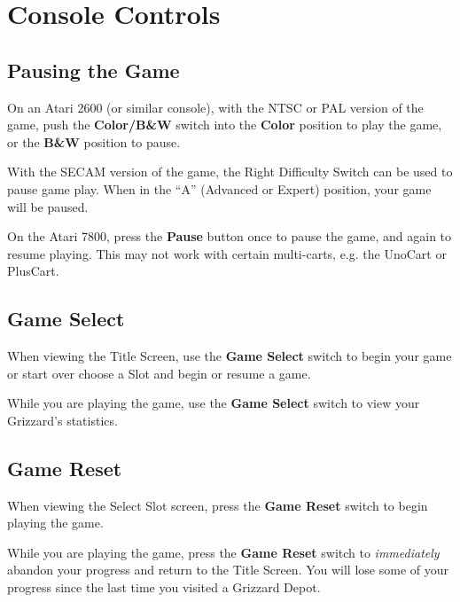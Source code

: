 \documentclass[10pt,twocolumn,openany,article]{memoir}
\begin{document}
\section{Console Controls}

\ifdefined\ATARIAGESAVE\vfill\fi

\subsection{Pausing the Game}

On an Atari 2600  (or similar console), with the NTSC  or PAL version of
the game,  push the  \textbf{Color/B\&W} switch into  the \textbf{Color}
position  to play  the game,  or  the \textbf{B\&W}  position to  pause.

\vfill

With the SECAM  version of the game, the Right  Difficulty Switch can be
used  to  pause game  play.  When  in  the  ``A'' (Advanced  or  Expert)
position, your  game will be paused.

\vfill

On the  Atari 7800, press  the \textbf{Pause}  button once to  pause the
game, and again to resume playing. \ifdefined\ATARIAGESAVE\else This may
not work with certain multi-carts, e.g. the UnoCart or PlusCart. \fi

\ifdefined\ATARIAGESAVE\vfill\fi

\subsection{Game Select}

When viewing  the Title Screen,  use the \textbf{Game Select}  switch to
\ifdefined\NOSAVE begin your game or start  over \else choose a Slot and
begin or resume a game. \fi

While you  are playing the  game, use the  \textbf{Game Select}
switch to view your Grizzard's  statistics.

\ifdefined\ATARIAGESAVE\vfill\pagebreak\fi

\subsection{Game Reset}

When  viewing the  Select  Slot screen,  press  the \textbf{Game  Reset}
switch to begin playing the game.

While you are playing the game,  press the \textbf{Game Reset} switch to
\emph{immediately} abandon your progress and return to the Title Screen.
You will  lose some  of your  progress since the  last time  you visited
a Grizzard Depot.
\end{document}
